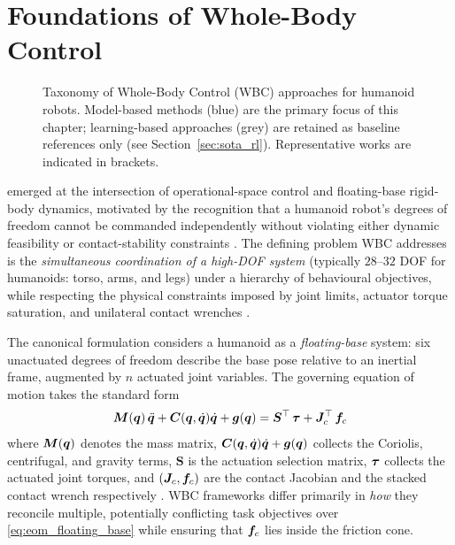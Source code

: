 \section{Foundations of Whole-Body Control}
\label{sec:sota_foundations}

\begin{figure}[htbp]
  \centering
  \singlespacing
  \resizebox{\textwidth}{!}{}
  \caption{Taxonomy of Whole-Body Control (WBC) approaches for humanoid robots.
           Model-based methods (blue) are the primary focus of this chapter;
           learning-based approaches (grey) are retained as baseline references only
           (see Section~\ref{sec:sota_rl}).
           Representative works are indicated in brackets.}
  \label{fig:wbc_taxonomy}
\end{figure}

\WBC{} emerged at the intersection of operational-space control
\cite{Khatib1987} and floating-base rigid-body dynamics, motivated by the
recognition that a humanoid robot's degrees of freedom cannot be
commanded independently without violating either dynamic feasibility or
contact-stability constraints \cite{Sentis2005}. The defining problem WBC
addresses is the \emph{simultaneous coordination of a high-DOF system}
(typically $28$--$32$ DOF for humanoids: torso, arms, and legs) under a
hierarchy of behavioural objectives, while respecting the physical
constraints imposed by joint limits, actuator torque saturation, and
unilateral contact wrenches \cite{Sentis2005,Wensing2013}.

The canonical formulation considers a humanoid as a \emph{floating-base}
system: six unactuated degrees of freedom describe the base pose relative
to an inertial frame, augmented by $n$ actuated joint variables. The
governing equation of motion takes the standard form
\begin{equation}
  \bm{M}(\bm{q})\,\ddot{\bm{q}} + \bm{C}(\bm{q},\dot{\bm{q}})\dot{\bm{q}} + \bm{g}(\bm{q}) = \bm{S}^{\top}\,\bm{\tau} + \bm{J}_c^{\top}\,\bm{f}_c
  \label{eq:eom_floating_base}
\end{equation}
where $\bm{M}(\bm{q})$ denotes the mass matrix, $\bm{C}(\bm{q},\dot{\bm{q}})\dot{\bm{q}} + \bm{g}(\bm{q})$ collects the Coriolis,
centrifugal, and gravity terms, $\bm{S}$ is the actuation selection
matrix, $\bm{\tau}$ collects the actuated joint torques, and
$(\bm{J}_c,\bm{f}_c)$ are the contact Jacobian and the stacked contact wrench
respectively \cite{Sentis2005,Wensing2013,Koolen2016}. WBC frameworks
differ primarily in \emph{how} they reconcile multiple, potentially
conflicting task objectives over \eqref{eq:eom_floating_base} while
ensuring that $\bm{f}_c$ lies inside the friction cone.

